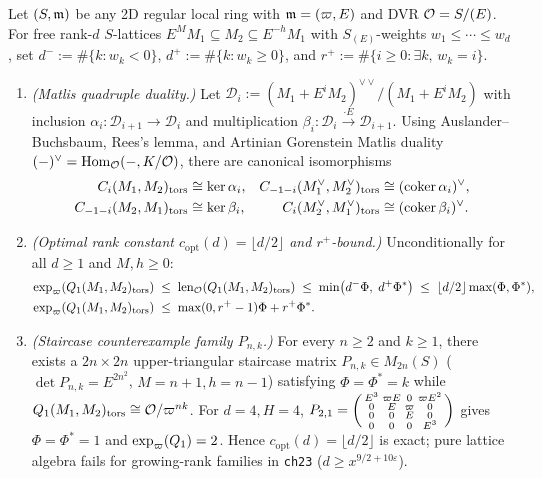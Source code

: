 \begin{theorem}\label{thm:2:matlis}
\tagProved{}
Let $(S, \mathfrak{m})$ be any 2D regular local ring with $\mathfrak{m} = (\varpi, E)$ and DVR $\mathcal{O} = S/(E)$. For free rank-$d$ $S$-lattices $E^M M_1 \subseteq M_2 \subseteq E^{-h} M_1$ with $S_{(E)}$-weights $w_1 \le \cdots \le w_d$, set $d^- := \#\{k : w_k < 0\}$, $d^+ := \#\{k : w_k \ge 0\}$, and $r^+ := \#\{i \ge 0 : \exists k,\, w_k = i\}$.
\begin{enumerate}[label=\textup{(\roman*)}]
\item \emph{(Matlis quadruple duality.)} Let $\mathcal{D}_i := (M_1 + E^i M_2)^{\vee\vee}/(M_1 + E^i M_2)$ with inclusion $\alpha_i : \mathcal{D}_{i+1} \to \mathcal{D}_i$ and multiplication $\beta_i : \mathcal{D}_i \xrightarrow{\cdot E} \mathcal{D}_{i+1}$. Using Auslander--Buchsbaum, Rees's lemma, and Artinian Gorenstein Matlis duality $(- )^\vee = \mathrm{Hom}_{\mathcal{O}}(-, K/\mathcal{O})$, there are canonical isomorphisms
\begin{align*}
  C_i(M_1, M_2)_{\mathrm{tors}} &\cong \ker\alpha_i, & C_{-1-i}(M_1^\vee, M_2^\vee)_{\mathrm{tors}} &\cong (\operatorname{coker}\alpha_i)^\vee,\\
  C_{-1-i}(M_2, M_1)_{\mathrm{tors}} &\cong \ker\beta_i, & C_i(M_2^\vee, M_1^\vee)_{\mathrm{tors}} &\cong (\operatorname{coker}\beta_i)^\vee.
\end{align*}
\item \emph{(Optimal rank constant $c_{\mathrm{opt}}(d) = \lfloor d/2 \rfloor$ and $r^+$-bound.)} Unconditionally for all $d \ge 1$ and $M, h \ge 0$:
\begin{align}
  \exp_\varpi(Q_1(M_1, M_2)_{\mathrm{tors}}) &\;\le\; \operatorname{len}_{\mathcal{O}}(Q_1(M_1, M_2)_{\mathrm{tors}}) \;\le\; \min\bigl(d^- \Phi,\; d^+ \Phi^*\bigr) \;\le\; \lfloor d/2 \rfloor \max(\Phi, \Phi^*), \label{eq:2:copt}\\
  \exp_\varpi(Q_1(M_1, M_2)_{\mathrm{tors}}) &\;\le\; \max(0, r^+ - 1)\Phi + r^+ \Phi^*. \label{eq:2:rplus}
\end{align}
\item \emph{(Staircase counterexample family $P_{n,k}$.)} For every $n \ge 2$ and $k \ge 1$, there exists a $2n \times 2n$ upper-triangular staircase matrix $P_{n,k} \in M_{2n}(S)$ ($\det P_{n,k} = E^{2n^2}$, $M = n+1, h = n-1$) satisfying $\Phi = \Phi^* = k$ while $Q_1(M_1, M_2)_{\mathrm{tors}} \cong \mathcal{O}/\varpi^{nk}$. For $d = 4, H = 4$, $P_{2,1} = \begin{psmallmatrix} E^3 & \varpi E & 0 & \varpi E^2 \\ 0 & E & \varpi & 0 \\ 0 & 0 & E & 0 \\ 0 & 0 & 0 & E^3 \end{psmallmatrix}$ gives $\Phi = \Phi^* = 1$ and $\exp_\varpi(Q_1) = 2$. Hence $c_{\mathrm{opt}}(d) = \lfloor d/2 \rfloor$ is exact; pure lattice algebra fails for growing-rank families in \texttt{ch23} ($d \ge x^{9/2+10\varepsilon}$).
\end{enumerate}
\end{theorem}
